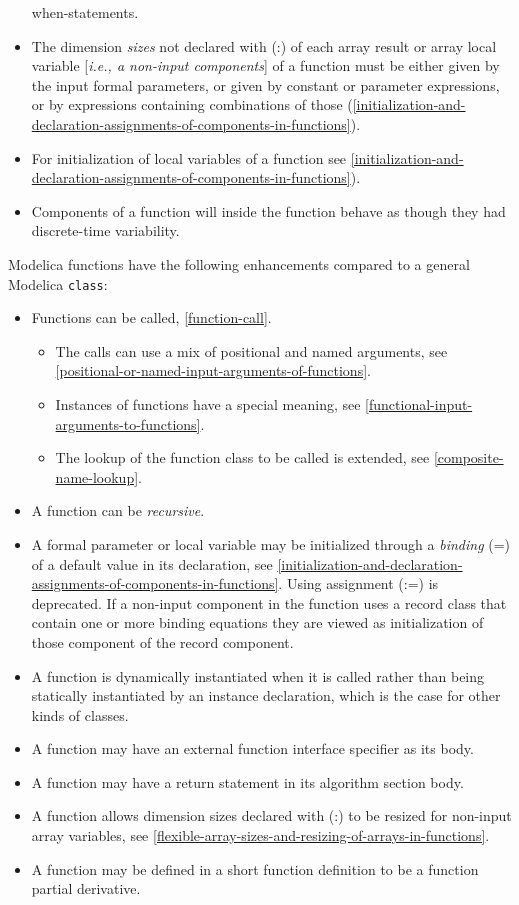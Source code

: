 \begin{itemize}
  when-statements.
\item
  The dimension \emph{sizes} not declared with (:) of each array result
  or array local variable {[}\emph{i.e., a non-input components}{]} of a
  function must be either given by the input formal parameters, or given
  by constant or parameter expressions, or by expressions containing
  combinations of those (\autoref{initialization-and-declaration-assignments-of-components-in-functions}).
\item
  For initialization of local variables of a function see \autoref{initialization-and-declaration-assignments-of-components-in-functions}).
\item
  Components of a function will inside the function behave as though
  they had discrete-time variability.
\end{itemize}

Modelica functions have the following enhancements compared to a general
Modelica \lstinline!class!:

\begin{itemize}
\item
  Functions can be called, \autoref{function-call}.

  \begin{itemize}
  \item
    The calls can use a mix of positional and named arguments, see
    \autoref{positional-or-named-input-arguments-of-functions}.
  \item
    Instances of functions have a special meaning, see \autoref{functional-input-arguments-to-functions}.
  \item
    The lookup of the function class to be called is extended, see
    \autoref{composite-name-lookup}.
  \end{itemize}
\item
  A function can be \emph{recursive}.
\item
  A formal parameter or local variable may be initialized through a
  \emph{binding} (=) of a default value in its declaration,
  see \autoref{initialization-and-declaration-assignments-of-components-in-functions}.
  Using assignment (:=) is deprecated. If a non-input component in the
  function uses a record class that contain one or more binding
  equations they are viewed as initialization of those component of the
  record component.
\item
  A function is dynamically instantiated when it is called rather than
  being statically instantiated by an instance declaration, which is the
  case for other kinds of classes.
\item
  A function may have an external function interface specifier as its
  body.
\item
  A function may have a return statement in its algorithm section body.
\item
  A function allows dimension sizes declared with (:) to be resized for
  non-input array variables, see \autoref{flexible-array-sizes-and-resizing-of-arrays-in-functions}.
\item
  A function may be defined in a short function definition to be a
  function partial derivative.
\end{itemize}

